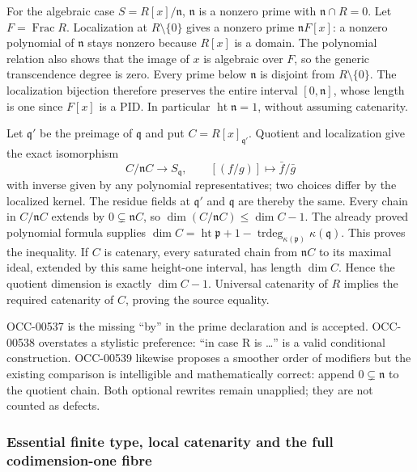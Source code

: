 For the algebraic case \(S=R[x]/\mathfrak n\), \(\mathfrak n\) is a nonzero prime with \(\mathfrak n\cap R=0\). Let \(F=\operatorname{Frac}R\). Localization at \(R\setminus\{0\}\) gives a nonzero prime \(\mathfrak nF[x]\): a nonzero polynomial of \(\mathfrak n\) stays nonzero because \(R[x]\) is a domain. The polynomial relation also shows that the image of \(x\) is algebraic over \(F\), so the generic transcendence degree is zero. Every prime below \(\mathfrak n\) is disjoint from \(R\setminus\{0\}\). The localization bijection therefore preserves the entire interval \([0,\mathfrak n]\), whose length is one since \(F[x]\) is a PID. In particular \(\operatorname{ht}\mathfrak n=1\), without assuming catenarity.

Let \(\mathfrak q'\) be the preimage of \(\mathfrak q\) and put \(C=R[x]_{\mathfrak q'}\). Quotient and localization give the exact isomorphism \[
 C/\mathfrak nC\longrightarrow S_{\mathfrak q},\qquad
 [(f/g)]\longmapsto \bar f/\bar g
\] with inverse given by any polynomial representatives; two choices differ by the localized kernel. The residue fields at \(\mathfrak q'\) and \(\mathfrak q\) are thereby the same. Every chain in \(C/\mathfrak nC\) extends by \(0\subsetneq\mathfrak nC\), so \(\dim(C/\mathfrak nC)\leq\dim C-1\). The already proved polynomial formula supplies \(\dim C=\operatorname{ht}\mathfrak p+1-
\operatorname{trdeg}_{\kappa(\mathfrak p)}\kappa(\mathfrak q)\). This proves the inequality. If \(C\) is catenary, every saturated chain from \(\mathfrak nC\) to its maximal ideal, extended by this same height-one interval, has length \(\dim C\). Hence the quotient dimension is exactly \(\dim C-1\). Universal catenarity of \(R\) implies the required catenarity of \(C\), proving the source equality.

OCC-00537 is the missing ``by'' in the prime declaration and is accepted. OCC-00538 overstates a stylistic preference: ``in case R is \ldots{}'' is a valid conditional construction. OCC-00539 likewise proposes a smoother order of modifiers but the existing comparison is intelligible and mathematically correct: append \(0\subsetneq\mathfrak n\) to the quotient chain. Both optional rewrites remain unapplied; they are not counted as defects.

\subsubsection{Essential finite type, local catenarity and the full codimension-one fibre}\label{essential-finite-type-local-catenarity-and-the-full-codimension-one-fibre}

